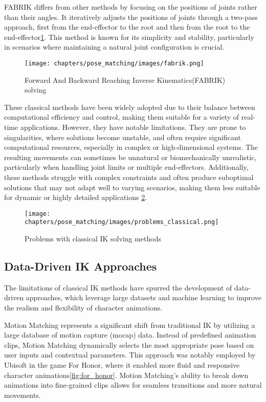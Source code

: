 \documentclass[../../main.tex]{subfiles}
\begin{document}
FABRIK differs from other methods by focusing on the positions of joints rather than their angles. It iteratively adjusts the positions of joints through a two-pass approach, first from the end-effector to the root and then from the root to the end-effector\ref{fig:fabrik}. This method is known for its simplicity and stability, particularly in scenarios where maintaining a natural joint configuration is crucial\cite{TODO}.

\begin{figure}
  \centering \texttt{[image: chapters/pose\_matching/images/fabrik.png]}
  \caption{Forward And Backward Reaching Inverse Kinematics(FABRIK) solving}
  \label{fig:fabrik}
\end{figure}

These classical methods have been widely adopted due to their balance between computational efficiency and control, making them suitable for a variety of real-time applications. However, they have notable limitations. They are prone to singularities, where solutions become unstable, and often require significant computational resources, especially in complex or high-dimensional systems. The resulting movements can sometimes be unnatural or biomechanically unrealistic, particularly when handling joint limits or multiple end-effectors. Additionally, these methods struggle with complex constraints and often produce suboptimal solutions that may not adapt well to varying scenarios, making them less suitable for dynamic or highly detailed applications \ref{fig:problems_classical}.

\begin{figure}
  \centering \texttt{[image: chapters/pose\_matching/images/problems\_classical.png]}
  \caption{Problems with classical IK solving methods}
  \label{fig:problems_classical}
\end{figure}

\subsection{Data-Driven IK Approaches}

The limitations of classical IK methods have spurred the development of data-driven approaches, which leverage large datasets and machine learning to improve the realism and flexibility of character animations.

Motion Matching represents a significant shift from traditional IK by utilizing a large database of motion capture (mocap) data. Instead of predefined animation clips, Motion Matching dynamically selects the most appropriate pose based on user inputs and contextual parameters. This approach was notably employed by Ubisoft in the game For Honor, where it enabled more fluid and responsive character animations\ref{fig:for_honor}. Motion Matching's ability to break down animations into fine-grained clips allows for seamless transitions and more natural movements\cite{TODO}.
\end{document}
